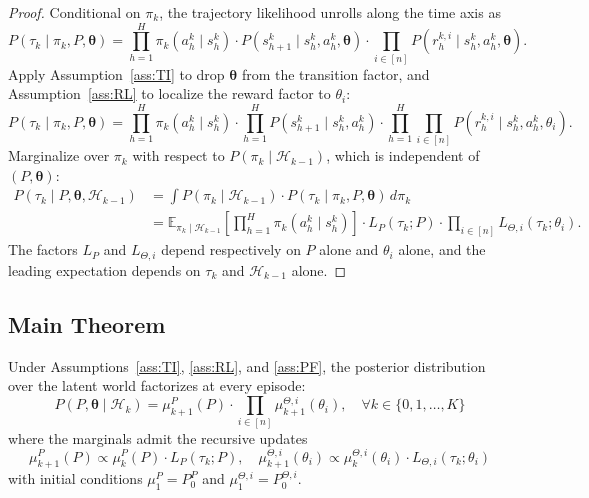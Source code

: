 \begin{proof}
Conditional on $\pi_k$, the trajectory likelihood unrolls along the time axis as
\begin{equation}
P(\tau_k \mid \pi_k, P, \boldsymbol{\theta}) = \prod_{h=1}^H \pi_k(a_h^k \mid s_h^k) \cdot P(s_{h+1}^k \mid s_h^k, a_h^k, \boldsymbol{\theta}) \cdot \prod_{i \in [n]} P(r_h^{k,i} \mid s_h^k, a_h^k, \boldsymbol{\theta}).
\end{equation}
Apply Assumption~\ref{ass:TI} to drop $\boldsymbol{\theta}$ from the transition factor, and Assumption~\ref{ass:RL} to localize the reward factor to $\theta_i$:
\begin{equation}
P(\tau_k \mid \pi_k, P, \boldsymbol{\theta}) = \prod_{h=1}^H \pi_k(a_h^k \mid s_h^k) \cdot \prod_{h=1}^H P(s_{h+1}^k \mid s_h^k, a_h^k) \cdot \prod_{h=1}^H \prod_{i \in [n]} P(r_h^{k,i} \mid s_h^k, a_h^k, \theta_i).
\end{equation}
Marginalize over $\pi_k$ with respect to $P(\pi_k \mid \mathcal{H}_{k-1})$, which is independent of $(P, \boldsymbol{\theta})$:
\begin{align}
P(\tau_k \mid P, \boldsymbol{\theta}, \mathcal{H}_{k-1}) &= \int P(\pi_k \mid \mathcal{H}_{k-1}) \cdot P(\tau_k \mid \pi_k, P, \boldsymbol{\theta}) \, d\pi_k \\
&= \mathbb{E}_{\pi_k \mid \mathcal{H}_{k-1}}\left[\prod_{h=1}^H \pi_k(a_h^k \mid s_h^k)\right] \cdot L_P(\tau_k; P) \cdot \prod_{i \in [n]} L_{\Theta,i}(\tau_k; \theta_i).
\end{align}
The factors $L_P$ and $L_{\Theta,i}$ depend respectively on $P$ alone and $\theta_i$ alone, and the leading expectation depends on $\tau_k$ and $\mathcal{H}_{k-1}$ alone.
\end{proof}

\subsection{Main Theorem}

\begin{theorem}
\label{thm:decoupling-app}
Under Assumptions~\ref{ass:TI}, \ref{ass:RL}, and \ref{ass:PF}, the posterior distribution over the latent world factorizes at every episode:
\begin{equation}
\label{eq:decoupling-app}
P(P, \boldsymbol{\theta} \mid \mathcal{H}_k) = \mu_{k+1}^P(P) \cdot \prod_{i \in [n]} \mu_{k+1}^{\Theta,i}(\theta_i), \quad \forall k \in \{0, 1, \ldots, K\}
\end{equation}
where the marginals admit the recursive updates
\begin{equation}
\mu_{k+1}^P(P) \propto \mu_k^P(P) \cdot L_P(\tau_k; P), \quad \mu_{k+1}^{\Theta,i}(\theta_i) \propto \mu_k^{\Theta,i}(\theta_i) \cdot L_{\Theta,i}(\tau_k; \theta_i)
\end{equation}
with initial conditions $\mu_1^P = P_0^P$ and $\mu_1^{\Theta,i} = P_0^{\Theta,i}$.
\end{theorem}

